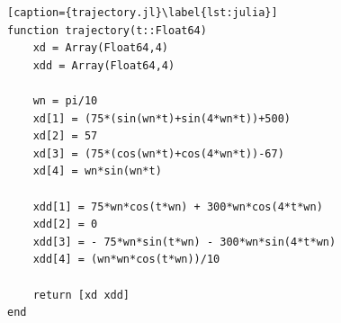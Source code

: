 \begin{lstlisting}[caption={trajectory.jl}\label{lst:julia}]
function trajectory(t::Float64)
	xd = Array(Float64,4)
	xdd = Array(Float64,4)

	wn = pi/10
	xd[1] = (75*(sin(wn*t)+sin(4*wn*t))+500)
    xd[2] = 57
    xd[3] = (75*(cos(wn*t)+cos(4*wn*t))-67)
    xd[4] = wn*sin(wn*t)

    xdd[1] = 75*wn*cos(t*wn) + 300*wn*cos(4*t*wn)
    xdd[2] = 0
    xdd[3] = - 75*wn*sin(t*wn) - 300*wn*sin(4*t*wn)
    xdd[4] = (wn*wn*cos(t*wn))/10
	
	return [xd xdd]
end
\end{lstlisting} 


